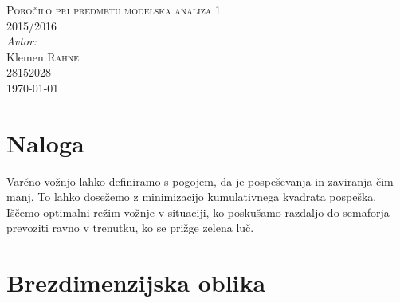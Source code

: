 \documentclass[11pt]{article}
\numberwithin{equation}{section} %
\numberwithin{table}{section} %
\begin{document}
\begin{titlepage}
 \textsc{\large Poročilo pri predmetu modelska analiza 1}\\
 \textsc{\large 2015/2016}\\[1cm] %
 



\Large \emph{Avtor:}\\
Klemen \textsc{Rahne}\\
28152028\\[2cm]

{\large \today } \\[0.5cm] %

	

\end{titlepage}

\tableofcontents


\section{Naloga}

Varčno vožnjo lahko definiramo s pogojem, da je pospeševanja in zaviranja čim manj. To lahko dosežemo z minimizacijo kumulativnega kvadrata pospeška. Iščemo optimalni režim vožnje v situaciji, ko poskušamo razdaljo do semaforja prevoziti ravno v trenutku, ko se prižge zelena luč.


\section{Brezdimenzijska oblika}
\end{document}
